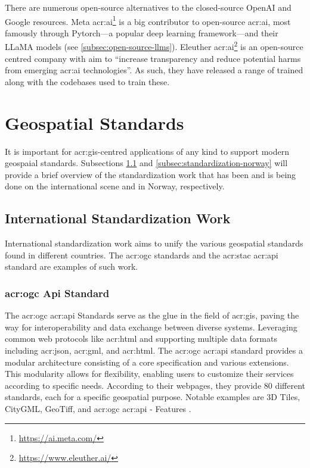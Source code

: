 There are numerous open-source alternatives to the closed-source OpenAI and Google resources. Meta \acrshort{acr:ai}\footnote{\url{https://ai.meta.com/}} is a big contributor to open-source \acrshort{acr:ai}, most famously through Pytorch---a popular deep learning framework---and their LLaMA models (see \autoref{subsec:open-source-llms}). Eleuther \acrshort{acr:ai}\footnote{\url{https://www.eleuther.ai/}} is an open-source centred company with aim to \enquote{increase transparency and reduce potential harms from emerging \acrshort{acr:ai} technologies}. As such, they have released a range of trained  along with the codebases used to train these.

\section{Geospatial Standards}\label{sec:geospatial-standards}

It is important for \acrshort{acr:gis}-centred applications of any kind to support modern geospaial standards. Subsections \ref{subsec:standardization-international} and \ref{subsec:standardization-norway} will provide a brief overview of the standardization work that has been and is being done on the international scene and in Norway, respectively.

\subsection{International Standardization Work}\label{subsec:standardization-international}

International standardization work aims to unify the various geospatial standards found in different countries. The \acrshort{acr:ogc} standards and the \acrshort{acr:stac} \acrshort{acr:api} standard are examples of such work.

\subsubsection[OGC Standards]{\acrshort{acr:ogc} Api Standard}\label{subsubsec:ogc}

The \gls{acr:ogc} \acrshort{acr:api} Standards serve as the glue in the field of \gls{acr:gis}, paving the way for interoperability and data exchange between diverse systems. Leveraging common web protocols like \acrshort{acr:html} and supporting multiple data formats including \acrshort{acr:json}, \acrshort{acr:gml}, and \acrshort{acr:html}. The \gls{acr:ogc} \acrshort{acr:api} standard provides a modular architecture consisting of a core specification and various extensions. This modularity allows for flexibility, enabling users to customize their services according to specific needs. According to their webpages, they provide 80 different standards, each for a specific geospatial purpose. Notable examples are 3D Tiles, CityGML, GeoTiff, and \acrshort{acr:ogc} \acrshort{acr:api} - Features \citep{ogcOGCStandards2023}.

